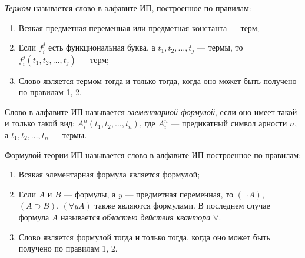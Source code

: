 \begin{definition*}
    \textit{Термом} называется слово в алфавите ИП, построенное по правилам:
    \begin{enumerate}
        \item Всякая предметная переменная или предметная константа --- терм;
        \item Если $f_i^j$ есть функциональная буква, а $t_1, t_2, \dots, t_j$ --- термы, то $f_i^j(t_1, t_2, \dots, t_j)$ --- терм;
        \item Слово является термом тогда и только тогда, когда оно может быть получено по правилам 1, 2.
    \end{enumerate}
\end{definition*}

\begin{definition*}
    Слово в алфавите ИП называется \textit{элементарной формулой}, если оно имеет такой и только такой вид: $A_i^n(t_1, t_2, \dots, t_n)$, где $A_i^n$ --- предикатный символ арности $n$, а $t_1, t_2, \dots, t_n$ --- термы.
\end{definition*}

\begin{definition*}
    Формулой теории ИП называется слово в алфавите ИП построенное по правилам:
    \begin{enumerate}
        \item Всякая элементарная формула является формулой;
        \item Если $A$ и $B$ --- формулы, а $y$ --- предметная переменная, то $(\neg A)$, $(A \supset B)$, $(\forall yA)$ также являются формулами. В последнем случае формула $A$ называется \textit{областью действия квантора} $\forall$.
        \item Слово является формулой тогда и только тогда, когда оно может быть получено по правилам 1, 2. 
    \end{enumerate}
\end{definition*}

